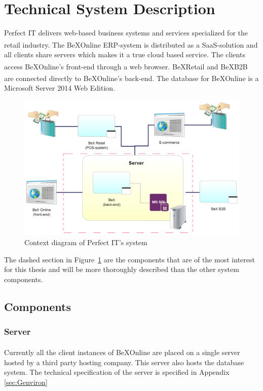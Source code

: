 \documentclass{cslthse-msc}
\newcommand{\bex}{BeX\textsuperscript{\textregistered}}
\begin{document}
\section{Technical System Description}
Perfect IT delivers web-based business systems and services specialized for the retail industry. The \bex Online ERP-system is distributed as a SaaS-solution and all clients share servers which makes it a true cloud based service. The clients access \bex Online's front-end through a web browser. \bex Retail and \bex B2B are connected directly to \bex Online's back-end.
The database for \bex Online is a Microsoft Server 2014 Web Edition.
\begin{figure}[H]
\vspace{-15pt}
  \begin{center}
    \includegraphics[scale=0.3]{Pictures/Systemdesc.png}
  \end{center}
  \caption{Context diagram of Perfect IT's system}
  \label{context}
  \vspace{-15pt}
\end{figure}
\noindent The dashed section in Figure~\ref{context} are the components that are of the most interest for this thesis and will be more thoroughly described than the other system components.

\subsection{Components}


\subsubsection{Server}
Currently all the client instances of \bex Online are placed on a single server hosted by a third party hosting company. This server also hosts the database system.
The technical specification of the server is specified in Appendix \ref{sec:Genviron}
\end{document}

